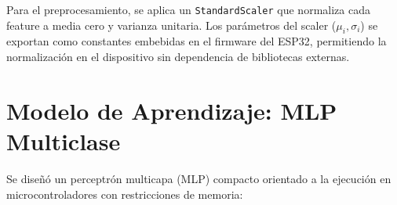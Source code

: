 \begin{table}[H]
\centering
\caption{Vector de 13 features extraídas por flujo.}
\label{tab:features}
\small
{}
\end{table}

Para el preprocesamiento, se aplica un \texttt{StandardScaler} que normaliza cada feature a media cero y varianza unitaria. Los parámetros del scaler ($\mu_i, \sigma_i$) se exportan como constantes embebidas en el firmware del ESP32, permitiendo la normalización en el dispositivo sin dependencia de bibliotecas externas.

\section{Modelo de Aprendizaje: MLP Multiclase}
\label{sec:modelo_mlp}

Se diseñó un perceptrón multicapa (MLP) compacto orientado a la ejecución en microcontroladores con restricciones de memoria:

